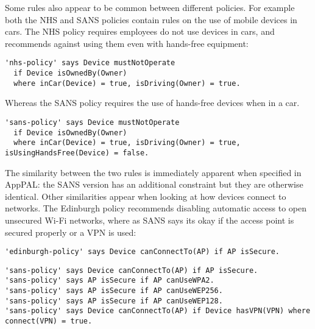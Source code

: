 \documentclass{easychair}
\begin{document}
Some rules also appear to be common between different policies.
For example both the NHS and SANS policies contain rules on the use of mobile devices in cars.
The NHS policy requires employees do not use devices in cars, and recommends against using them even with hands-free equipment:
\begin{lstlisting}[title={\footnotesize\textbf{NHS}:~\itshape ``%
For safety reasons, Trust staff must not use a hand held mobile device whilst driving any vehicle. It is illegal to do so. Please refer to the most up-to-date information via the Highways Agency.  For safety reasons, Trust staff must not use a hand held mobile device whilst driving any vehicle. It is illegal to do so. Please refer to the most up-to-date information via the Highways Agency.''}]
'nhs-policy' says Device mustNotOperate 
  if Device isOwnedBy(Owner)
  where inCar(Device) = true, isDriving(Owner) = true.
\end{lstlisting}
Whereas the SANS policy requires the use of hands-free devices when in a car.
\begin{lstlisting}[title={\footnotesize\textbf{SANS}:~\itshape ``Conducting telephone calls or utilizing handhelds while driving can be a safety hazard. Drivers should use handhelds in hand only while parked or out of the vehicle.
If employees must use a handheld device while driving, ⟨Company⟩ requires the use of hands-free headset devices.''}]
'sans-policy' says Device mustNotOperate 
  if Device isOwnedBy(Owner)
  where inCar(Device) = true, isDriving(Owner) = true, isUsingHandsFree(Device) = false.
\end{lstlisting}
The similarity between the two rules is immediately apparent when specified in AppPAL: the SANS version has an additional constraint but they are otherwise identical.
Other similarities appear when looking at how devices connect to networks.  The Edinburgh policy recommends disabling automatic access to open unsecured Wi-Fi networks, where as SANS says its okay if the access point is secured properly or a VPN is used:
\begin{lstlisting}[title={\footnotesize\textbf{Edinburgh}:~\itshape ``Control your devices connections by disabling automatic connection to open, unsecured Wi-Fi networks.''}]
'edinburgh-policy' says Device canConnectTo(AP) if AP isSecure.
\end{lstlisting}
\begin{lstlisting}[title={\footnotesize\textbf{SANS}:~\itshape ``If mobile workers do require connectivity through public, open, or untrusted WLAN, then users MUST use WLANs using, if available and in this order: WPA(2) encryption, WEP 256 bits (or 128 bits), or finally open networks if nothing else is available. Users connected to data networks in an open environment MUST use a VPN connection.''}]
'sans-policy' says Device canConnectTo(AP) if AP isSecure.
'sans-policy' says AP isSecure if AP canUseWPA2.
'sans-policy' says AP isSecure if AP canUseWEP256.
'sans-policy' says AP isSecure if AP canUseWEP128.
'sans-policy' says Device canConnectTo(AP) if Device hasVPN(VPN) where connect(VPN) = true.
\end{lstlisting}
\end{document}
